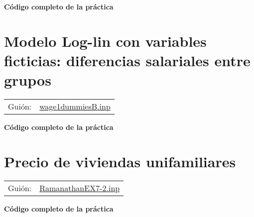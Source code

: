 \documentclass[11pt]{article}
\begin{document}
\vspace{10pt}
\noindent
\textbf{Código completo de la práctica}
\vspace{10pt}

\clearpage


\section{Modelo Log-lin con variables ficticias: diferencias salariales entre grupos}
\label{sec:org8817b78}
\begin{center}
\begin{tabular}{ll}
Guión: & \href{https://github.com/mbujosab/Ectr/tree/master/Practicas/Gretl/scripts/wage1dummiesB.inp}{wage1dummiesB.inp}\\[0pt]
\end{tabular}
\end{center}

\vspace{10pt}
\noindent
\textbf{Código completo de la práctica}
\vspace{10pt}

\clearpage



\section{Precio de viviendas unifamiliares}
\label{sec:org4570bf5}
\begin{center}
\begin{tabular}{ll}
Guión: & \href{https://github.com/mbujosab/Ectr/tree/master/Practicas/Gretl/scripts/RamanathanEX7-2.inp}{RamanathanEX7-2.inp}\\[0pt]
\end{tabular}
\end{center}

\vspace{10pt}
\noindent
\textbf{Código completo de la práctica}
\vspace{10pt}

\clearpage
\end{document}
